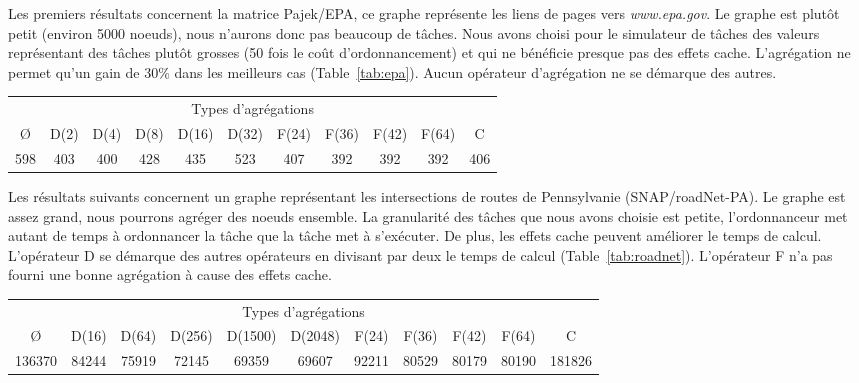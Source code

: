 Les premiers résultats concernent la matrice Pajek/EPA, ce graphe représente les liens de pages vers {\em www.epa.gov}.
%
Le graphe est plutôt petit (environ 5000 noeuds), nous n'aurons donc pas beaucoup de tâches.
%
Nous avons choisi pour le simulateur de tâches des valeurs représentant des tâches plutôt grosses (50 fois le coût d'ordonnancement) et qui ne bénéficie presque pas des effets cache.
%
L'agrégation ne permet qu'un gain de 30\% dans les meilleurs cas (Table~\ref{tab:epa}).
%
Aucun opérateur d'agrégation ne se démarque des autres.

\begin{center}
  \begin{tabular}{|c|c|c|c|c|c|c|c|c|c|c|}
    \hline
    \multicolumn{11}{|c|}{Types d'agrégations}\\
    \O & D(2) & D(4) & D(8) & D(16) & D(32) & F(24) & F(36) & F(42) & F(64) & C \\
    \hline
    598 & 403 & 400 & 428 & 435 & 523 & 407 & 392 & 392 & 392 & 406 \\
    \hline
  \end{tabular}
  \label{tab:epa}
\end{center}


Les résultats suivants concernent un graphe représentant les intersections de routes de Pennsylvanie (SNAP/roadNet-PA).
%
Le graphe est assez grand, nous pourrons agréger des noeuds ensemble.
%
La granularité des tâches que nous avons choisie est petite, l'ordonnanceur met autant de temps à ordonnancer la tâche que la tâche met à s'exécuter.
%
De plus, les effets cache peuvent améliorer le temps de calcul.
%
L'opérateur D se démarque des autres opérateurs en divisant par deux le temps de calcul (Table~\ref{tab:roadnet}).
%
L'opérateur F n'a pas fourni une bonne agrégation à cause des effets cache.


\begin{center}
  \begin{tabular}{|c|c|c|c|c|c|c|c|c|c|c|}
    \hline
    \multicolumn{11}{|c|}{Types d'agrégations}\\
    \O & D(16) & D(64) & D(256) & D(1500) & D(2048) & F(24) & F(36) & F(42) & F(64) & C \\
    \hline
    136370 & 84244 & 75919 & 72145 & 69359 & 69607 & 92211 & 80529 & 80179 & 80190 & 181826 \\
    \hline
  \end{tabular}
  \label{tab:roadnet}
\end{center}


